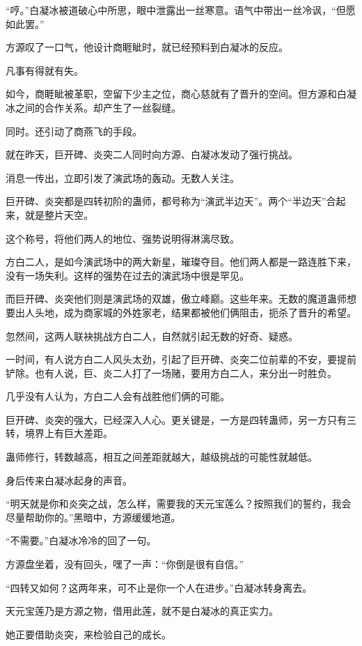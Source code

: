 \begin{this_body}
“哼。”白凝冰被道破心中所思，眼中泄露出一丝寒意。语气中带出一丝冷讽，“但愿如此罢。”

方源叹了一口气，他设计商睚眦时，就已经预料到白凝冰的反应。

凡事有得就有失。

如今，商睚眦被革职，空留下少主之位，商心慈就有了晋升的空间。但方源和白凝冰之间的合作关系。却产生了一丝裂缝。

同时。还引动了商燕飞的手段。

就在昨天，巨开碑、炎突二人同时向方源、白凝冰发动了强行挑战。

消息一传出，立即引发了演武场的轰动。无数人关注。

巨开碑、炎突都是四转初阶的蛊师，都号称为“演武半边天”。两个“半边天”合起来，就是整片天空。

这个称号，将他们两人的地位、强势说明得淋漓尽致。

方白二人，是如今演武场中的两大新星，璀璨夺目。他们两人都是一路连胜下来，没有一场失利。这样的强势在过去的演武场中很是罕见。

而巨开碑、炎突他们则是演武场的双雄，傲立峰巅。这些年来。无数的魔道蛊师想要出人头地，成为商家城的外姓家老，结果都被他们俩阻击，扼杀了晋升的希望。

忽然间，这两人联袂挑战方白二人，自然就引起无数的好奇、疑惑。

一时间，有人说方白二人风头太劲，引起了巨开碑、炎突二位前辈的不安，要提前铲除。也有人说，巨、炎二人打了一场赌，要用方白二人，来分出一时胜负。

几乎没有人认为，方白二人会有战胜他们俩的可能。

巨开碑、炎突的强大，已经深入人心。更关键是，一方是四转蛊师，另一方只有三转，境界上有巨大差距。

蛊师修行，转数越高，相互之间差距就越大，越级挑战的可能性就越低。

身后传来白凝冰起身的声音。

“明天就是你和炎突之战，怎么样，需要我的天元宝莲么？按照我们的誓约，我会尽量帮助你的。”黑暗中，方源缓缓地道。

“不需要。”白凝冰冷冷的回了一句。

方源盘坐着，没有回头，嘿了一声：“你倒是很有自信。”

“四转又如何？这两年来，可不止是你一个人在进步。”白凝冰转身离去。

天元宝莲乃是方源之物，借用此莲，就不是白凝冰的真正实力。

她正要借助炎突，来检验自己的成长。


\end{this_body}
